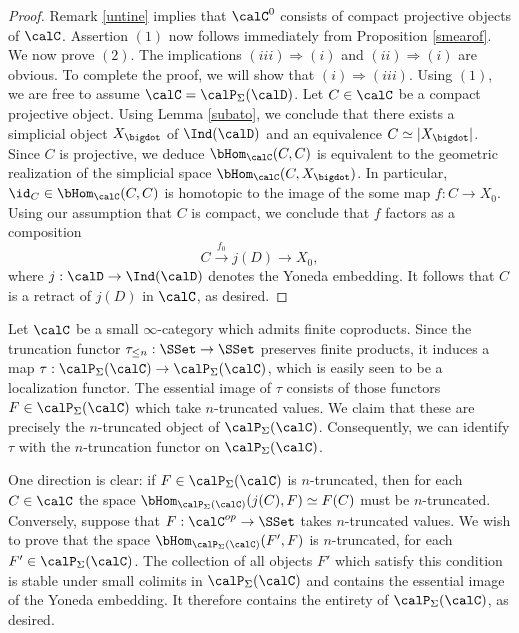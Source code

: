 \begin{proof}
Remark \ref{untine} implies that $\calC^{0}$ consists of compact projective objects of $\calC$.
Assertion $(1)$ now follows immediately from Proposition \ref{smearof}. We now prove $(2)$.
The implications $(iii) \Rightarrow (i)$ and $(ii) \Rightarrow (i)$ are obvious. To complete the proof, we will show that
$(i) \Rightarrow (iii)$. Using $(1)$, we are free to assume $\calC = \calP_{\Sigma}(\calD)$.
Let $C \in \calC$ be a compact projective object.
Using Lemma \ref{subato}, we conclude that there exists a simplicial object
$X_{\bigdot}$ of $\Ind(\calD)$ and an equivalence $C \simeq | X_{\bigdot} |$. Since
$C$ is projective, we deduce $\bHom_{\calC}(C,C)$ is equivalent to the geometric realization of the simplicial space $\bHom_{\calC}(C, X_{\bigdot})$. In particular, $\id_{C} \in \bHom_{\calC}(C,C)$ is homotopic to the image of the some map $f: C \rightarrow X_0$. Using our assumption that
$C$ is compact, we conclude that $f$ factors as a composition
$$ C \stackrel{f_0}{\rightarrow} j(D) \rightarrow X_0,$$
where $j: \calD \rightarrow \Ind(\calD)$ denotes the Yoneda embedding. It follows that
$C$ is a retract of $j(D)$ in $\calC$, as desired.
\end{proof}

\begin{remark}\label{parei}
Let $\calC$ be a small $\infty$-category which admits finite coproducts. Since
the truncation functor $\tau_{\leq n}: \SSet \rightarrow \SSet$ preserves finite products,
it induces a map $\tau: \calP_{\Sigma}(\calC) \rightarrow \calP_{\Sigma}(\calC)$, which is easily seen to be a localization functor. The essential image of $\tau$ consists of those functors
$F \in \calP_{\Sigma}(\calC)$ which take $n$-truncated values. We claim that these
are precisely the $n$-truncated object of $\calP_{\Sigma}(\calC)$. Consequently, we can
identify $\tau$ with the $n$-truncation functor on $\calP_{\Sigma}(\calC)$.

One direction is clear: if $F \in \calP_{\Sigma}(\calC)$ is $n$-truncated, then for each $C \in \calC$ the space $\bHom_{ \calP_{\Sigma}(\calC)}( j(C), F) \simeq F(C)$ must be $n$-truncated. Conversely,
suppose that $F: \calC^{op} \rightarrow \SSet$ takes $n$-truncated values. We wish to prove that
the space $\bHom_{ \calP_{\Sigma}(\calC)}(F', F)$ is $n$-truncated, for each $F' \in \calP_{\Sigma}(\calC)$. The collection of all objects $F'$ which satisfy this condition is stable under small colimits in $\calP_{\Sigma}(\calC)$ and contains the essential image of the Yoneda embedding. It therefore contains the entirety of $\calP_{\Sigma}(\calC)$, as desired.
\end{remark} 

